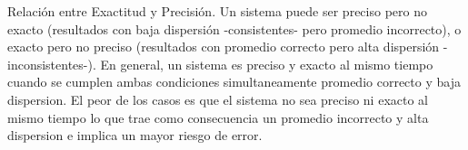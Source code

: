 \begin{itemize}
\begin{marginfigure}
    \caption[Relación entre Exactitud y Precisión.]{Relación entre Exactitud y Precisión. Un sistema puede ser preciso pero no exacto (resultados con baja dispersión -consistentes- pero promedio incorrecto), o exacto pero no preciso (resultados con promedio correcto pero alta dispersión -inconsistentes-). En general, un sistema es preciso y exacto al mismo tiempo cuando se cumplen ambas condiciones simultaneamente promedio correcto y baja dispersion. El peor de los casos es que el sistema no sea preciso ni exacto al mismo tiempo lo que trae como consecuencia un promedio incorrecto y alta dispersion e implica un mayor riesgo de error.}\label{fig:acc_prec}
    \end{marginfigure}


\end{itemize}
